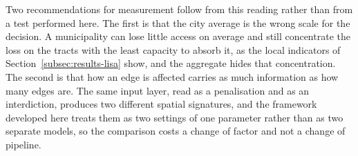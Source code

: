 Two recommendations for measurement follow from this reading rather than from a test performed here. The first is that the city average is the wrong scale for the decision. A municipality can lose little access on average and still concentrate the loss on the tracts with the least capacity to absorb it, as the local indicators of Section~\ref{subsec:results-lisa} show, and the aggregate hides that concentration. The second is that how an edge is affected carries as much information as how many edges are. The same input layer, read as a penalisation and as an interdiction, produces two different spatial signatures, and the framework developed here treats them as two settings of one parameter rather than as two separate models, so the comparison costs a change of factor and not a change of pipeline.
